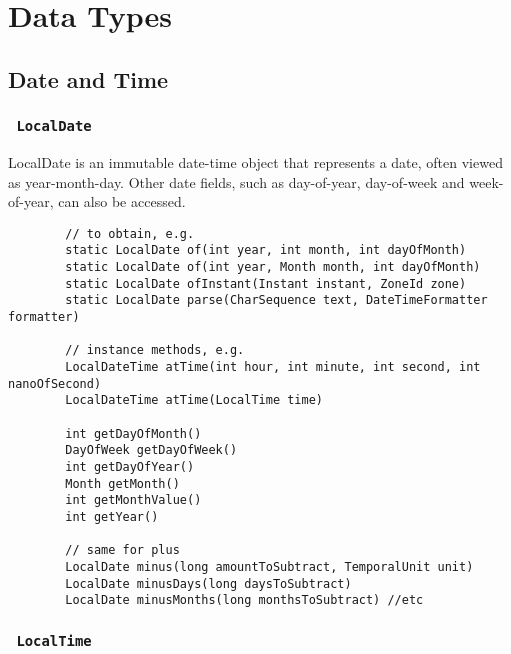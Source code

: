 \documentclass{scrartcl}
\begin{document}



\section{Data Types}

\subsection{Date and Time}

\subsubsection{\lstinline$ LocalDate $}

    LocalDate is an immutable date-time object that represents a date, often viewed as year-month-day. Other date fields, such as day-of-year, day-of-week and week-of-year, can also be accessed.

    \begin{lstlisting}
        // to obtain, e.g.
        static LocalDate of(int year, int month, int dayOfMonth)
        static LocalDate of(int year, Month month, int dayOfMonth)
        static LocalDate ofInstant(Instant instant, ZoneId zone)
        static LocalDate parse(CharSequence text, DateTimeFormatter formatter)

        // instance methods, e.g.
        LocalDateTime atTime(int hour, int minute, int second, int nanoOfSecond)
        LocalDateTime atTime(LocalTime time)

        int getDayOfMonth()
        DayOfWeek getDayOfWeek()
        int getDayOfYear()
        Month getMonth()
        int getMonthValue()
        int getYear()

        // same for plus
        LocalDate minus(long amountToSubtract, TemporalUnit unit)
        LocalDate minusDays(long daysToSubtract)
        LocalDate minusMonths(long monthsToSubtract) //etc
    \end{lstlisting}

\subsubsection{\lstinline$ LocalTime $}
\end{document}
